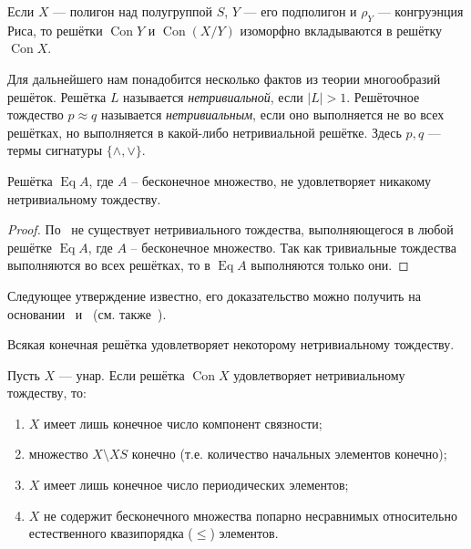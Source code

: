 \documentclass[11pt,twoside,final
]{article}
\def\Con{\operatorname{Con}}
\def\Eq{\operatorname{Eq}}
\begin{document}
\begin{lemma} \label{lemma:1}
	Если $X$ — полигон над полугруппой $S$, $Y$ — его подполигон и $\rho_Y$ — конгруэнция Риса, то решётки $\Con Y$ и $\Con (X/Y)$ изоморфно вкладываются в решётку $\Con X$.
\end{lemma}

Для дальнейшего нам понадобится несколько фактов из теории многообразий решёток.
Решётка $L$ называется \textit{нетривиальной}, если $|L| > 1$.
Решёточное тождество $p \approx q$ называется \textit{нетривиальным}, если оно выполняется не во всех решётках, но выполняется в какой-либо нетривиальной решётке.
Здесь $p,q$ — термы сигнатуры $\{ \land , \lor \}$.

\begin{lemma}\label{lemma:2}
	Решётка $\Eq A$, где $A$ -- бесконечное множество, не удовлетворяет никакому нетривиальному тождеству.
\end{lemma}
\begin{proof}
	По~\cite[предпоследнее следствие]{Sachs_14} не существует нетривиального тождества, выполняющегося в любой решётке $\Eq A$, где $A$ -- бесконечное множество.
	Так как тривиальные тождества выполняются во всех решётках, то в $\Eq A$ выполняются только они.
\end{proof}

Следующее утверждение известно, его доказательство можно получить на основании~\cite[следствие 3.14]{Kohn_9} и~\cite[теорема 8 главы VI]{en_Gretzer_10} (см. также~\cite[лемма 3]{Kozhukhov_8}).
\begin{lemma}\label{lemma:3}
	Всякая конечная решётка удовлетворяет некоторому нетривиальному тождеству.
\end{lemma}

\begin{lemma} \label{lemma:4}
	Пусть $X$ — унар.
	Если решётка $\Con X$ удовлетворяет нетривиальному тождеству, то:
	\begin{enumerate}
		\item $X$ имеет лишь конечное число компонент связности;
		\item множество $X \setminus XS$ конечно (т.е. количество начальных элементов конечно);
		\item $X$ имеет лишь конечное число периодических элементов;
		\item $X$ не содержит бесконечного множества попарно несравнимых относительно естественного квазипорядка ($\leqslant$) элементов.
	\end{enumerate}
\end{lemma}
\end{document}
